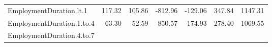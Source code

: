 \documentclass[]{article}
\begin{document}
\begin{longtable}[]{@{}lrrrrrr@{}}
\begin{minipage}[t]{0.31\columnwidth}\raggedright\strut
EmploymentDuration.lt.1\strut
\end{minipage} & \begin{minipage}[t]{0.10\columnwidth}\raggedleft\strut
117.32\strut
\end{minipage} & \begin{minipage}[t]{0.08\columnwidth}\raggedleft\strut
105.86\strut
\end{minipage} & \begin{minipage}[t]{0.08\columnwidth}\raggedleft\strut
-812.96\strut
\end{minipage} & \begin{minipage}[t]{0.08\columnwidth}\raggedleft\strut
-129.06\strut
\end{minipage} & \begin{minipage}[t]{0.08\columnwidth}\raggedleft\strut
347.84\strut
\end{minipage} & \begin{minipage}[t]{0.08\columnwidth}\raggedleft\strut
1147.31\strut
\end{minipage}\tabularnewline
\begin{minipage}[t]{0.31\columnwidth}\raggedright\strut
EmploymentDuration.1.to.4\strut
\end{minipage} & \begin{minipage}[t]{0.10\columnwidth}\raggedleft\strut
63.30\strut
\end{minipage} & \begin{minipage}[t]{0.08\columnwidth}\raggedleft\strut
52.59\strut
\end{minipage} & \begin{minipage}[t]{0.08\columnwidth}\raggedleft\strut
-850.57\strut
\end{minipage} & \begin{minipage}[t]{0.08\columnwidth}\raggedleft\strut
-174.93\strut
\end{minipage} & \begin{minipage}[t]{0.08\columnwidth}\raggedleft\strut
278.40\strut
\end{minipage} & \begin{minipage}[t]{0.08\columnwidth}\raggedleft\strut
1069.55\strut
\end{minipage}\tabularnewline
\begin{minipage}[t]{0.31\columnwidth}\raggedright\strut
EmploymentDuration.4.to.7\strut
\end{minipage} & \begin{minipage}[t]{0.10\columnwidth}\raggedleft\strut

\end{minipage}
\end{longtable}
\end{document}
